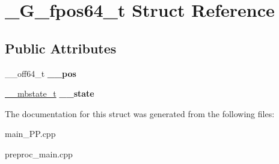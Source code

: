 \hypertarget{struct__G__fpos64__t}{\section{\+\_\+\+G\+\_\+fpos64\+\_\+t Struct Reference}
\label{struct__G__fpos64__t}
}
\subsection*{Public Attributes}
\begin{DoxyCompactItemize}
\item 
\hypertarget{struct__G__fpos64__t_a5e289da2680acfd68c15e8f96524a091}{\+\_\+\+\_\+off64\+\_\+t {\bfseries \+\_\+\+\_\+pos}}\label{struct__G__fpos64__t_a5e289da2680acfd68c15e8f96524a091}

\item 
\hypertarget{struct__G__fpos64__t_ac06ed638762dc499046cf91403aa58bb}{\hyperlink{struct____mbstate__t}{\+\_\+\+\_\+mbstate\+\_\+t} {\bfseries \+\_\+\+\_\+state}}\label{struct__G__fpos64__t_ac06ed638762dc499046cf91403aa58bb}

\end{DoxyCompactItemize}


The documentation for this struct was generated from the following files\+:\begin{DoxyCompactItemize}
\item 
main\+\_\+\+P\+P.\+cpp\item 
preproc\+\_\+main.\+cpp\end{DoxyCompactItemize}
